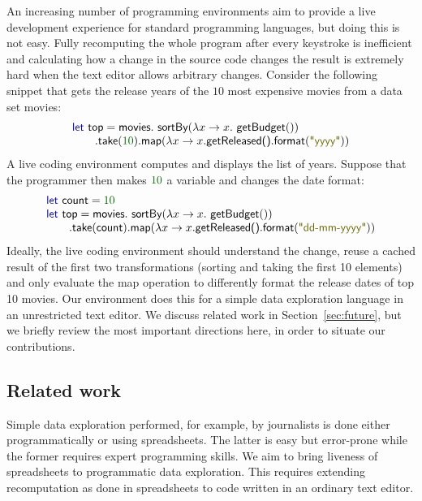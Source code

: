 \documentclass[english,submission]{programming}
\theoremstyle{plain}
\theoremstyle{definition}
\newcommand{\num}[1]{\textcolor{numclr}{#1}}
\newcommand{\str}[1]{\textnormal{\textcolor{strclr}{\sffamily "#1"}}}
\newcommand{\ident}[1]{\textnormal{\textcolor{idclr}{\sffamily #1}}}
\newcommand{\kvd}[1]{\textnormal{\textcolor{kvdclr}{\sffamily #1}}}
\begin{document}
An increasing number of programming environments aim to provide a live development experience
for standard programming languages, but doing this is not easy. Fully recomputing the whole program
after every keystroke is inefficient and calculating how a change in the source code changes the
result is extremely hard when the text editor allows arbitrary changes.
Consider the following snippet that gets the release years of the $10$ most expensive movies from a
data set \ident{movies}:
%
\begin{equation*}
\begin{array}{l}
\kvd{let}~\ident{top} =\ident{movies}.\ident{sortBy}(\lambda x \rightarrow x.\ident{getBudget}())\\
\qquad .\ident{take}(\num{10}).\ident{map}(\lambda x \rightarrow x.\ident{getReleased()}.\ident{format}(\str{yyyy}))\\
\end{array}
\end{equation*}
%
A live coding environment computes and displays the list of years. Suppose that the programmer then
makes $\num{10}$ a variable and changes the date format:
%
\begin{equation*}
\begin{array}{l}
\kvd{let}~\ident{count} = \num{10}\\
\kvd{let}~\ident{top} = \ident{movies}.\ident{sortBy}(\lambda x \rightarrow x.\ident{getBudget}())\\
\qquad .\ident{take}(\ident{count}).\ident{map}(\lambda x \rightarrow x.\ident{getReleased()}.\ident{format}(\str{dd-mm-yyyy}))\\
\end{array}
\end{equation*}
%
Ideally, the live coding environment should understand the change, reuse a cached result of the
first two transformations (sorting and taking the first 10 elements) and only evaluate the
\ident{map} operation to differently format the release dates of top 10 movies. Our environment
does this for a simple data exploration language in an unrestricted text editor. We discuss related
work in Section~\ref{sec:future}, but we briefly review the most important directions here, in
order to situate our contributions.

\subsection{Related work}
Simple data exploration performed, for example, by journalists \cite{ddj} is done either
programmatically or using spreadsheets. The latter is easy but error-prone while the former
requires expert programming skills. We aim to bring liveness of spreadsheets to programmatic
data exploration. This requires extending recomputation as done in spreadsheets \cite{spreadsheet}
to code written in an ordinary text editor.
\end{document}
